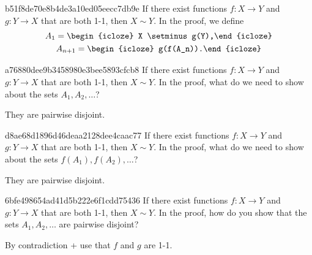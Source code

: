 \begin{note}{b51f8de70e8b4de3a10ed05eecc7db9e}
    If there exist functions \({ f : X \to Y }\) and \({ g : Y \to X }\) that are both 1-1, then \({ X \sim Y }\).
    In the proof, we define
    \[
        \begin{gathered}
            A_1 = \begin{icloze}{1}X \setminus g(Y),\end{icloze} \\
            A_{n+1} = \begin{icloze}{2}g(f(A_n)).\end{icloze}
        \end{gathered}
    \]
\end{note}

\begin{note}{a76880dee9b3458980e3bee5893cfcb8}
    If there exist functions \({ f : X \to Y }\) and \({ g : Y \to X }\) that are both 1-1, then \({ X \sim Y }\).
    In the proof, what do we need to show about the sets \({ A_1, A_2, \ldots }\)?

    \begin{cloze}{1}
        They are pairwise disjoint.
    \end{cloze}
\end{note}

\begin{note}{d8ae68d1896d46deaa2128dee4caac77}
    If there exist functions \({ f : X \to Y }\) and \({ g : Y \to X }\) that are both 1-1, then \({ X \sim Y }\).
    In the proof, what do we need to show about the sets \({ f(A_1), f(A_2), \ldots }\)?

    \begin{cloze}{1}
        They are pairwise disjoint.
    \end{cloze}
\end{note}

\begin{note}{6bfe498654ad41d5b222e6f1cdd75436}
    If there exist functions \({ f : X \to Y }\) and \({ g : Y \to X }\) that are both 1-1, then \({ X \sim Y }\).
    In the proof, how do you show that the sets \({ A_1, A_2, \ldots }\) are pairwise disjoint?

    \begin{cloze}{1}
        By contradiction + use that \({ f }\) and \({ g }\) are 1-1.
    \end{cloze}
\end{note}

